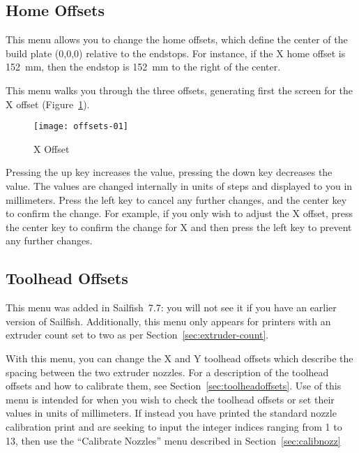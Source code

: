 
\subsection{Home Offsets} \label{sec:homeoff}

This menu allows you to change the \glspl{home offset}, which define the center of the build plate (0,0,0) relative to the endstops.  For instance, if the X home offset is 152~mm, then the endstop is 152~mm to the right of the center.

This menu walks you through the three offsets, generating first the screen for the X offset (Figure~\ref{fig:xoff}).

 \begin{figure}[!htbp]
  \centering
    \texttt{[image: offsets-01]}
    \caption{X Offset}
  \label{fig:xoff}
\end{figure}

Pressing the up key increases the value, pressing the down key decreases the value.  The values are changed internally in units of steps and displayed to you in millimeters.  Press the left key to cancel any further changes, and the center key to confirm the change.  For example, if you only wish to adjust the X offset, press the center key to confirm the change for X and then press the left key to prevent any further changes.


\subsection{Toolhead Offsets} \label{sec:tooloff}

This menu was added in Sailfish~7.7: you will not see it if you have an earlier version of Sailfish.  Additionally, this menu only appears for printers with an extruder count set to two as per Section~\ref{sec:extruder-count}.

With this menu, you can change the X and Y toolhead offsets which describe the spacing between the two extruder nozzles.  For a description of the toolhead offsets and how to calibrate them, see Section~\ref{sec:toolheadoffsets}.  Use of this menu is intended for when you wish to check the toolhead offsets or set their values in units of millimeters.  If instead you have printed the standard nozzle calibration print and are seeking to input the integer indices ranging from 1 to 13, then use the ``Calibrate Nozzles'' menu described in Section~\ref{sec:calibnozz}

